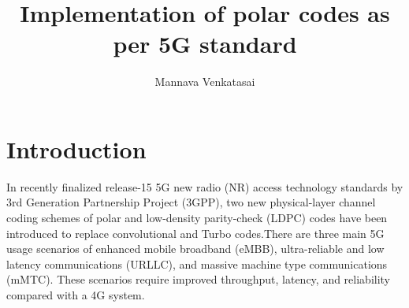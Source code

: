 \documentclass[journal,5pt,twocolumn]{IEEEtran}
\renewcommand\thesection{\arabic{section}}
\begin{document}
\let\StandardTheFigure\thefigure




\let\StandardTheFigure\thefigure
\let\StandardTheTable\thetable
\let\vec\mathbf





\def\putbox#1#2#3{\makebox[0in][l]{\makebox[#1][l]{}\raisebox{\baselineskip}[0in][0in]{\raisebox{#2}[0in][0in]{#3}}}}
     \def\rightbox#1{\makebox[0in][r]{#1}}
     \def\centbox#1{\makebox[0in]{#1}}
     \def\topbox#1{\raisebox{-\baselineskip}[0in][0in]{#1}}
     \def\midbox#1{\raisebox{-0.5\baselineskip}[0in][0in]{#1}}




\title{ 
Implementation of polar codes as per 5G standard
}



\author{Mannava Venkatasai}%



\maketitle
\tableofcontents

\section{\textbf{Introduction}}
\raggedright In recently finalized release-15 5G new radio (NR) access
technology standards by 3rd Generation Partnership Project
(3GPP), two new physical-layer channel coding schemes
of polar and low-density parity-check (LDPC) codes have
been introduced to replace convolutional and Turbo codes.There are three main 5G
usage scenarios of enhanced mobile broadband (eMBB),
ultra-reliable and low latency communications (URLLC),
and massive machine type communications (mMTC).
These scenarios require improved throughput, latency, and
reliability compared with a 4G system.
\end{document}

